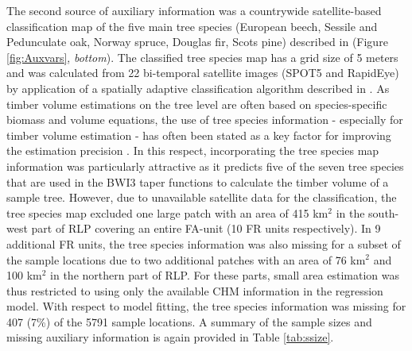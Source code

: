 The second source of auxiliary information was a countrywide satellite-based classification map of the five main tree species (European beech, Sessile and Pedunculate oak, Norway spruce, Douglas fir, Scots pine) described in \citet{stoffels2015} (Figure \ref{fig:Auxvars}, \textit{bottom}). The classified tree species map has a grid size of 5 meters and was calculated from 22 bi-temporal satellite images (SPOT5 and RapidEye) by application of a spatially adaptive classification algorithm described in \citet{stoffels2012}.  As timber volume estimations on the tree level are often based on species-specific biomass and volume equations, the use of tree species information - especially for timber volume estimation - has often been stated as a key factor for improving the estimation precision \cite{white2016}. In this respect, incorporating the tree species map information was particularly attractive as it predicts five of the seven tree species that are used in the BWI3 taper functions \citep{kublin2013} to calculate the timber volume of a sample tree. However, due to unavailable satellite data for the classification, the tree species map excluded one large patch with an area of 415 km$^2$ in the south-west part of RLP covering an entire FA-unit (10 FR units respectively). In 9 additional FR units, the tree species information was also missing for a subset of the sample locations due to two additional patches with an area of 76 km$^2$ and 100 km$^2$ in the northern part of RLP. For these parts, small area estimation was thus restricted to using only the available CHM information in the regression model. With respect to model fitting, the tree species information was missing for 407 (7\%) of the 5791 sample locations. A summary of the sample sizes and missing auxiliary information is again provided in Table \ref{tab:ssize}.

